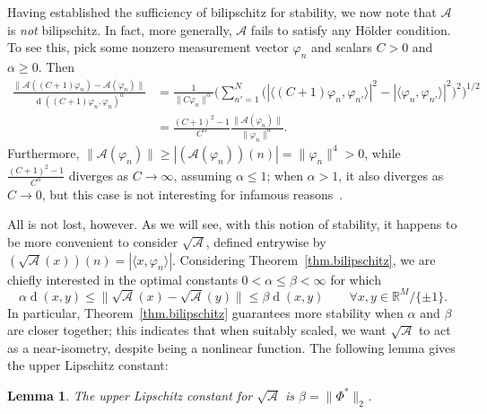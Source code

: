 \documentclass[times,10pt]{elsarticle}
\theoremstyle{plain}
\newtheorem{lemma}[theorem]{Lemma}
\begin{document}
Having established the sufficiency of bilipschitz for stability, we now note that $\mathcal{A}$ is \textit{not} bilipschitz.
In fact, more generally, $\mathcal{A}$ fails to satisfy any H\"{o}lder condition. 
To see this, pick some nonzero measurement vector $\varphi_n$ and scalars $C>0$ and $\alpha\geq0$.
Then
\begin{align*}
\frac{\|\mathcal{A}((C+1)\varphi_n)-\mathcal{A}(\varphi_n)\|}{\operatorname{d}((C+1)\varphi_n,\varphi_n)^\alpha}
&=\frac{1}{\|C\varphi_n\|^\alpha}\bigg(\sum_{n'=1}^N\Big(|\langle (C+1)\varphi_n,\varphi_{n'}\rangle|^2-|\langle \varphi_n,\varphi_{n'}\rangle|^2\Big)^2\bigg)^{1/2}\\
&=\frac{(C+1)^2-1}{C^\alpha}\frac{\|\mathcal{A}(\varphi_n)\|}{\|\varphi_n\|^\alpha}.
\end{align*}
Furthermore, $\|\mathcal{A}(\varphi_n)\|\geq|(\mathcal{A}(\varphi_n))(n)|=\|\varphi_n\|^4>0$, while $\frac{(C+1)^2-1}{C^\alpha}$ diverges as $C\rightarrow\infty$, assuming $\alpha\leq1$; when $\alpha>1$, it also diverges as $C\rightarrow0$, but this case is not interesting for infamous reasons~\cite{Lipton:10}.

All is not lost, however.
As we will see, with this notion of stability, it happens to be more convenient to consider $\sqrt{\mathcal{A}}$, defined entrywise by $(\sqrt{\mathcal{A}}(x))(n)=|\langle x,\varphi_n\rangle|$.
Considering Theorem~\ref{thm.bilipschitz}, we are chiefly interested in the optimal constants $0<\alpha\leq\beta<\infty$ for which
\begin{equation}
\label{eq.restricted isometry}
\alpha \operatorname{d}(x,y)
\leq \|\sqrt{\mathcal{A}}(x)-\sqrt{\mathcal{A}}(y)\|
\leq \beta \operatorname{d}(x,y)
\qquad
\forall x,y\in \mathbb{R}^M/\{\pm1\}.
\end{equation}
In particular, Theorem~\ref{thm.bilipschitz} guarantees more stability when $\alpha$ and $\beta$ are closer together; this indicates that when suitably scaled, we want $\sqrt{\mathcal{A}}$ to act as a near-isometry, despite being a nonlinear function. 
The following lemma gives the upper Lipschitz constant:

\begin{lemma}
\label{lemma.beta expression}
The upper Lipschitz constant for $\sqrt{\mathcal{A}}$ is $\beta=\|\Phi^*\|_2$.
\end{lemma}
\end{document}
